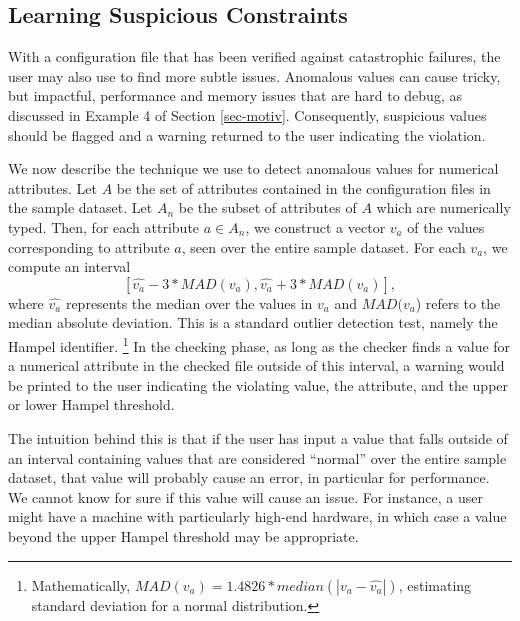 \subsection{Learning Suspicious Constraints}
\label{subsec-constraints}
With a configuration file that has been verified against catastrophic failures, the user may also use \app to find more subtle issues. Anomalous values can cause tricky, but impactful, performance and memory issues that are hard to debug, as discussed in Example 4 of Section \ref{sec-motiv}. 
Consequently, suspicious values should be flagged and a warning returned to the user indicating the violation.

We now describe the technique we use to detect anomalous values for 
numerical attributes. Let $A$ be the set of attributes contained in the 
configuration files in the sample dataset. 
Let $A_n$ be the subset of attributes of $A$ which are numerically typed. 
Then, for each attribute $a \in A_n$, we construct a vector $v_a$ of the 
values corresponding to attribute $a$, seen over the entire sample dataset.
For each $v_a$, we compute 
an interval  $$[\hat{v_a} - 3*MAD(v_a), \hat{v_a} + 3*MAD(v_a)],$$ 
where $\hat{v_a}$ represents the median over the values 
in $v_a$ and $MAD(v_a$) refers to the 
median absolute deviation. 
This is a standard outlier detection test, namely the Hampel identifier. 
\footnote{Mathematically, $MAD(v_a) = 1.4826* median(|v_a - \hat{v_a}|)$, estimating standard deviation 
for a normal distribution.} 
In the checking phase, as long as the checker finds a value for a numerical 
attribute in the checked file outside of this interval, 
a warning would be printed to the user indicating the violating value, 
the attribute, and the upper or lower Hampel threshold. 

The intuition behind this is that if the user has input a value 
that falls outside of an interval containing values that are considered 
``normal'' over the entire sample dataset, 
that value will probably cause an error, in particular for performance. 
We cannot know for sure if this value will cause an issue. 
For instance, a user might have a machine with 
particularly high-end hardware, 
in which case a value beyond the upper Hampel threshold may be appropriate. 

